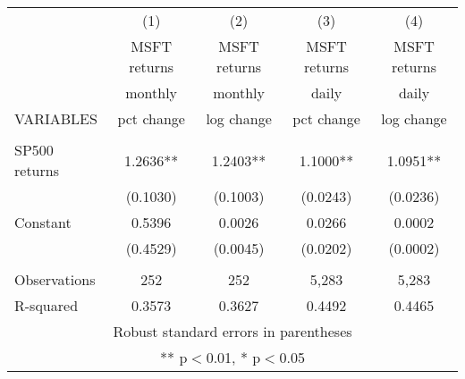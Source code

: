 \begin{tabular}{lcccc} \hline
 & (1) & (2) & (3) & (4) \\
 & MSFT returns & MSFT returns & MSFT returns & MSFT returns \\
 & monthly & monthly & daily & daily \\
VARIABLES & pct change & log change & pct change & log change \\ \hline
 &  &  &  &  \\
SP500 returns & 1.2636** & 1.2403** & 1.1000** & 1.0951** \\
 & (0.1030) & (0.1003) & (0.0243) & (0.0236) \\
Constant & 0.5396 & 0.0026 & 0.0266 & 0.0002 \\
 & (0.4529) & (0.0045) & (0.0202) & (0.0002) \\
 &  &  &  &  \\
Observations & 252 & 252 & 5,283 & 5,283 \\
 R-squared & 0.3573 & 0.3627 & 0.4492 & 0.4465 \\ \hline
\multicolumn{5}{c}{ Robust standard errors in parentheses} \\
\multicolumn{5}{c}{ ** p$<$0.01, * p$<$0.05} \\
\end{tabular}
